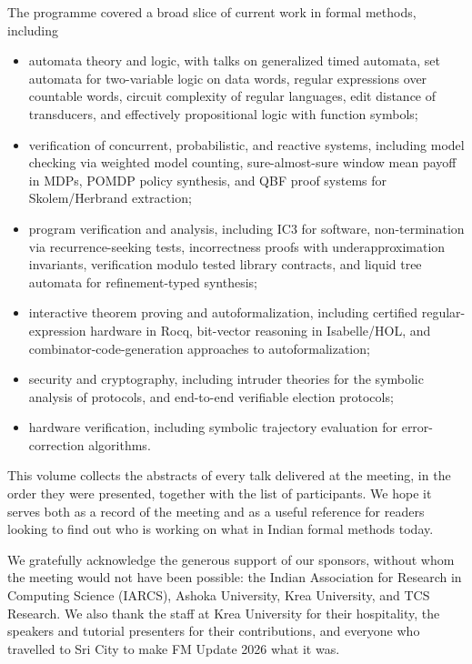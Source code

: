 \documentclass[a4paper,UKenglish]{dagrep-v2021}
\begin{document}
The programme covered a broad slice of current work in formal methods, including
\begin{itemize}
\item automata theory and logic, with talks on generalized timed automata, set automata for two-variable logic on data words, regular expressions over countable words, circuit complexity of regular languages, edit distance of transducers, and effectively propositional logic with function symbols;
\item verification of concurrent, probabilistic, and reactive systems, including model checking via weighted model counting, sure-almost-sure window mean payoff in MDPs, POMDP policy synthesis, and QBF proof systems for Skolem/Herbrand extraction;
\item program verification and analysis, including IC3 for software, non-termination via recurrence-seeking tests, incorrectness proofs with underapproximation invariants, verification modulo tested library contracts, and liquid tree automata for refinement-typed synthesis;
\item interactive theorem proving and autoformalization, including certified regular-expression hardware in Rocq, bit-vector reasoning in Isabelle/HOL, and combinator-code-generation approaches to autoformalization;
\item security and cryptography, including intruder theories for the symbolic analysis of protocols, and end-to-end verifiable election protocols;
\item hardware verification, including symbolic trajectory evaluation for error-correction algorithms.
\end{itemize}

This volume collects the abstracts of every talk delivered at the meeting, in the order they were presented, together with the list of participants. We hope it serves both as a record of the meeting and as a useful reference for readers looking to find out who is working on what in Indian formal methods today.

We gratefully acknowledge the generous support of our sponsors, without whom the meeting would not have been possible: the Indian Association for Research in Computing Science (IARCS), Ashoka University, Krea University, and TCS Research. We also thank the staff at Krea University for their hospitality, the speakers and tutorial presenters for their contributions, and everyone who travelled to Sri City to make FM Update 2026 what it was.

\tableofcontents
\end{document}
